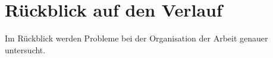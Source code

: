 \chapter{Rückblick auf den Verlauf}

Im Rückblick werden Probleme bei der Organisation der Arbeit genauer untersucht.